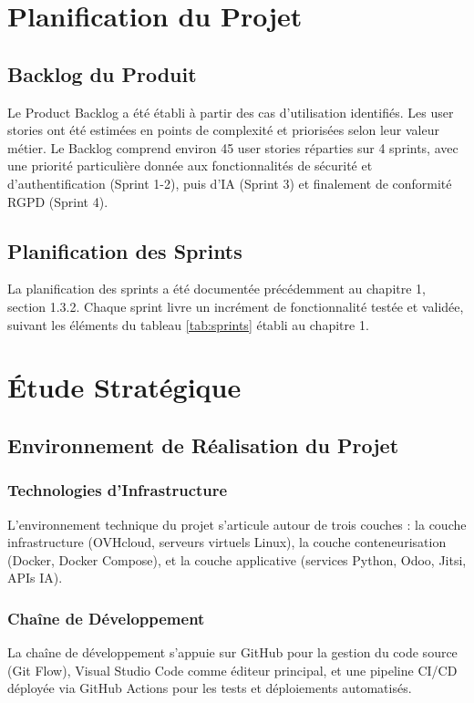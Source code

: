 \section{Planification du Projet}

\subsection{Backlog du Produit}
Le Product Backlog a été établi à partir des cas d'utilisation identifiés. Les user stories ont été estimées en points de complexité et priorisées selon leur valeur métier. Le Backlog comprend environ 45 user stories réparties sur 4 sprints, avec une priorité particulière donnée aux fonctionnalités de sécurité et d'authentification (Sprint 1-2), puis d'IA (Sprint 3) et finalement de conformité RGPD (Sprint 4).

\subsection{Planification des Sprints}
La planification des sprints a été documentée précédemment au chapitre 1, section 1.3.2. Chaque sprint livre un incrément de fonctionnalité testée et validée, suivant les éléments du tableau \ref{tab:sprints} établi au chapitre 1.

\section{Étude Stratégique}

\subsection{Environnement de Réalisation du Projet}

\subsubsection{Technologies d'Infrastructure}
L'environnement technique du projet s'articule autour de trois couches : la couche infrastructure (OVHcloud, serveurs virtuels Linux), la couche conteneurisation (Docker, Docker Compose), et la couche applicative (services Python, Odoo, Jitsi, APIs IA).

\subsubsection{Chaîne de Développement}
La chaîne de développement s'appuie sur GitHub pour la gestion du code source (Git Flow), Visual Studio Code comme éditeur principal, et une pipeline CI/CD déployée via GitHub Actions pour les tests et déploiements automatisés.

